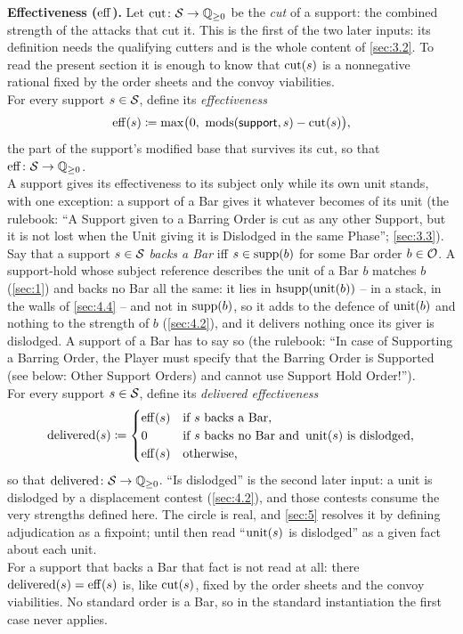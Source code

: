 \documentclass[12pt,a4paper]{article}
\begin{document}
\textbf{Effectiveness ($\operatorname{eff}$).}
Let $\operatorname{cut}\colon \mathcal{S} \to \mathbb{Q}_{\ge 0}$ be the \emph{cut} of a support: the combined strength of the attacks that cut it.
This is the first of the two later inputs: its definition needs the qualifying cutters and is the whole content of \cref{sec:3.2}.
To read the present section it is enough to know that $\operatorname{cut}(s)$ is a nonnegative rational fixed by the order sheets and the convoy viabilities.\\
For every support $s \in \mathcal{S}$, define its \emph{effectiveness}
\[
\operatorname{eff}(s) \coloneqq \max\bigl(0,\ \operatorname{mods}(\mathsf{support}, s) - \operatorname{cut}(s)\bigr),
\]
the part of the support's modified base that survives its cut, so that $\operatorname{eff}\colon \mathcal{S} \to \mathbb{Q}_{\ge 0}$.\\
A support gives its effectiveness to its subject only while its own unit stands, with one exception: a support of a Bar gives it whatever becomes of its unit (the rulebook: ``A Support given to a Barring Order is cut as any other Support, but it is not lost when the Unit giving it is Dislodged in the same Phase''; \cref{sec:3.3}).\\
Say that a support $s \in \mathcal{S}$ \emph{backs a Bar} iff $s \in \operatorname{supp}(b)$ for some Bar order $b \in \mathcal{O}$.
A support-hold whose subject reference describes the unit of a Bar $b$ matches $b$ (\cref{sec:1}) and backs no Bar all the same: it lies in $\operatorname{hsupp}(\operatorname{unit}(b))$ -- in a stack, in the walls of \cref{sec:4.4} -- and not in $\operatorname{supp}(b)$, so it adds to the defence of $\operatorname{unit}(b)$ and nothing to the strength of $b$ (\cref{sec:4.2}), and it delivers nothing once its giver is dislodged.
A support of a Bar has to say so (the rulebook: ``In case of Supporting a Barring Order, the Player must specify that the Barring Order is Supported (see below: Other Support Orders) and cannot use Support Hold Order!'').\\
For every support $s \in \mathcal{S}$, define its \emph{delivered effectiveness}
\[
\operatorname{delivered}(s) \coloneqq
\begin{cases}
\operatorname{eff}(s) & \text{if } s \text{ backs a Bar,} \\
0 & \text{if } s \text{ backs no Bar and } \operatorname{unit}(s) \text{ is dislodged,} \\
\operatorname{eff}(s) & \text{otherwise,}
\end{cases}
\]
so that $\operatorname{delivered}\colon \mathcal{S} \to \mathbb{Q}_{\ge 0}$.
``Is dislodged'' is the second later input: a unit is dislodged by a displacement contest (\cref{sec:4.2}), and those contests consume the very strengths defined here.
The circle is real, and \cref{sec:5} resolves it by defining adjudication as a fixpoint; until then read ``$\operatorname{unit}(s)$ is dislodged'' as a given fact about each unit.\\
For a support that backs a Bar that fact is not read at all: there $\operatorname{delivered}(s) = \operatorname{eff}(s)$ is, like $\operatorname{cut}(s)$, fixed by the order sheets and the convoy viabilities.
No standard order is a Bar, so in the standard instantiation the first case never applies.
\end{document}
